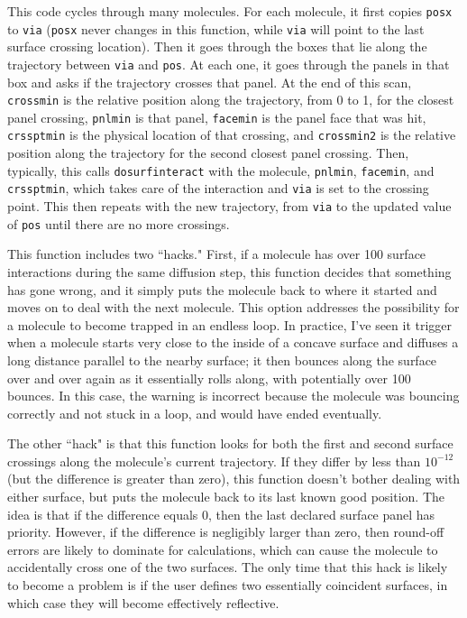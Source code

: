 \documentclass {scrbook}
\newcommand {\ttt} {\texttt}
\begin{document}
\begin{description}
This code cycles through many molecules. For each molecule, it first copies \ttt{posx} to \ttt{via} (\ttt{posx} never changes in this function, while \ttt{via} will point to the last surface crossing location). Then it goes through the boxes that lie along the trajectory between \ttt{via} and \ttt{pos}. At each one, it goes through the panels in that box and asks if the trajectory crosses that panel. At the end of this scan, \ttt{crossmin} is the relative position along the trajectory, from 0 to 1, for the closest panel crossing, \ttt{pnlmin} is that panel, \ttt{facemin} is the panel face that was hit, \ttt{crssptmin} is the physical location of that crossing, and \ttt{crossmin2} is the relative position along the trajectory for the second closest panel crossing. Then, typically, this calls \ttt{dosurfinteract} with the molecule, \ttt{pnlmin}, \ttt{facemin}, and \ttt{crssptmin}, which takes care of the interaction and \ttt{via} is set to the crossing point. This then repeats with the new trajectory, from \ttt{via} to the updated value of \ttt{pos} until there are no more crossings.

This function includes two ``hacks." First, if a molecule has over 100 surface interactions during the same diffusion step, this function decides that something has gone wrong, and it simply puts the molecule back to where it started and moves on to deal with the next molecule. This option addresses the possibility for a molecule to become trapped in an endless loop. In practice, I've seen it trigger when a molecule starts very close to the inside of a concave surface and diffuses a long distance parallel to the nearby surface; it then bounces along the surface over and over again as it essentially rolls along, with potentially over 100 bounces. In this case, the warning is incorrect because the molecule was bouncing correctly and not stuck in a loop, and would have ended eventually.

The other ``hack" is that this function looks for both the first and second surface crossings along the molecule's current trajectory. If they differ by less than $10^{-12}$ (but the difference is greater than zero), this function doesn't bother dealing with either surface, but puts the molecule back to its last known good position. The idea is that if the difference equals 0, then the last declared surface panel has priority. However, if the difference is negligibly larger than zero, then round-off errors are likely to dominate for calculations, which can cause the molecule to accidentally cross one of the two surfaces. The only time that this hack is likely to become a problem is if the user defines two essentially coincident surfaces, in which case they will become effectively reflective.


\end{description}
\end{document}
